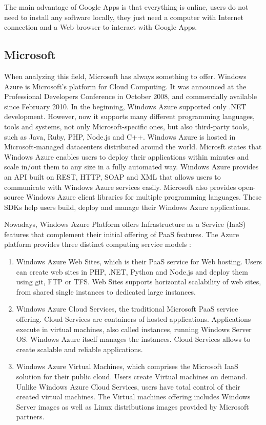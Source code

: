 \par
The main advantage of Google Apps is that everything is online, users do not need to install any software locally, they just need a computer with Internet connection and a Web browser to interact with Google Apps.

\subsection{Microsoft}

When analyzing this field, Microsoft has always something to offer. Windows Azure \cite{Azure} is Microsoft's platform for Cloud Computing. It was announced at the Professional Developers Conference in October 2008,  and commercially available since February 2010. In the beginning, Windows Azure supported only .NET development. However, now it supports many different programming languages, tools and systems, not only Microsoft-specific ones, but also third-party tools, such as Java, Ruby, PHP, Node.js and C++. Windows Azure is hosted in Microsoft-managed datacenters distributed around the world. Microsft states that Windows Azure enables users to deploy their applications within minutes and scale in/out them to any size in a fully automated way.
Windows Azure provides an API built on REST, HTTP, SOAP and XML that allows users to communicate with Windows Azure services easily. Microsoft also provides open-source Windows Azure client libraries for multiple programming languages. These SDKs help users build, deploy and manage their Windows Azure applications.
\par
Nowadays, Windows Azure Platform offers Infrastructure as a Service (IaaS) features that complement their initial offering of PaaS features. The Azure platform provides three distinct computing service models \cite{Azure:description}:
\begin{enumerate}
\item Windows Azure Web Sites, which is their PaaS service for Web hosting. Users can create web sites in PHP, .NET, Python and Node.js and deploy them using git, FTP or TFS. Web Sites supports horizontal scalability of web sites, from shared single instances to dedicated large instances.
\item Windows Azure Cloud Services, the traditional Microsoft PaaS service offering. Cloud Services are containers of hosted applications. Applications execute in virtual machines, also called instances, running Windows Server OS. Windows Azure itself manages the instances. Cloud Services allows to create scalable and reliable applications.
\item Windows Azure Virtual Machines, which comprises the Microsoft IaaS solution for their public cloud. Users create Virtual machines on demand. Unlike Windows Azure Cloud Services, users have total control of their created virtual machines. The Virtual machines offering includes Windows Server images as well as Linux distributions images provided by Microsoft partners.
\end{enumerate}

